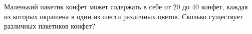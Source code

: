 \question
Маленький пакетик конфет может содержать в себе от 20 до 40 конфет, каждая из которых окрашена в один из шести различных цветов. Сколько существует различных пакетиков конфет? 
